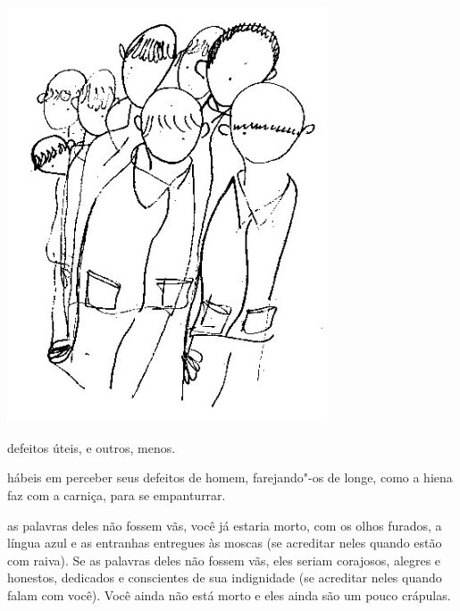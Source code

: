 \bigskip
\bigskip


\pagebreak
\thispagestyle{empty}

\begin{vplace}[.50]
\begin{center}
\includegraphics[width=95mm]{./imgs/Image_10.jpg}
\end{center}
\end{vplace}

\pagebreak
\thispagestyle{empty}

\movetooddpage

 defeitos úteis, e outros, menos.

\bigskip
\bigskip

 hábeis em perceber seus defeitos de homem, farejando"-os de longe,
como a hiena faz com a carniça, para se empanturrar.

\bigskip
\bigskip

 as palavras deles não fossem vãs, você já estaria morto, com os olhos
furados, a língua azul e as entranhas entregues às moscas (se acreditar
neles quando estão com raiva). Se as palavras deles não fossem vãs, eles
seriam corajosos, alegres e honestos, dedicados e conscientes de sua
indignidade (se acreditar neles quando falam com você). Você ainda não
está morto e eles ainda são um pouco crápulas.

